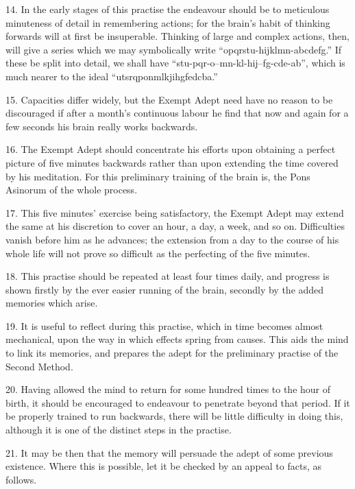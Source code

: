 \begin{sloppypar}
14. In the early stages of this practise the endeavour should be to meticulous minuteness of detail in remembering actions; for the brain’s habit of thinking forwards will at first be insuperable. Thinking of large and complex actions, then, will give a series which we may symbolically write \mbox{\enquote{opqrstu-hijklmn-abcdefg.}} If these be split into detail, we shall have \mbox{\enquote{stu-pqr-o--mn-kl-hij--fg-cde-ab}}, which is much nearer to the ideal \mbox{\enquote{utsrqponmlkjihgfedcba.}}
\end{sloppypar}

15. Capacities differ widely, but the Exempt Adept need have no reason to be discouraged if after a month’s continuous labour he find that now and again for a few seconds his brain really works backwards.

16. The Exempt Adept should concentrate his efforts upon obtaining a perfect picture of five minutes backwards rather than upon extending the time covered by his meditation. For this preliminary training of the brain is, the Pons Asinorum of the whole process.

17. This five minutes' exercise being satisfactory, the Exempt Adept may extend the same at his discretion to cover an hour, a day, a week, and so on. Difficulties vanish before him as he advances; the extension from a day to the course of his whole life will not prove so difficult as the perfecting of the five minutes.

18. This practise should be repeated at least four times  daily, and progress is shown firstly by the ever easier running of the brain, secondly by the added memories which arise.

19. It is useful to reflect during this practise, which in time becomes almost mechanical, upon the way in which effects spring from causes. This aids the mind to link its memories, and prepares the adept for the preliminary practise of the Second Method.

20. Having allowed the mind to return for some hundred times to the hour of birth, it should be encouraged to endeavour to penetrate beyond that period. If it be properly trained to run backwards, there will be little difficulty in doing this, although it is one of the distinct steps in the practise.

21. It may be then that the memory will persuade the adept of some previous existence. Where this is possible, let it be checked by an appeal to facts, as follows.

